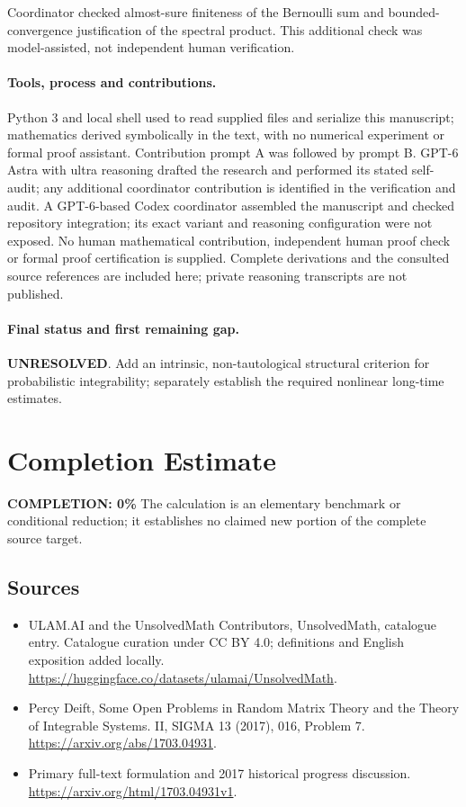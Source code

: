 \documentclass[11pt]{article}
\begin{document}
Coordinator checked almost-sure finiteness of the Bernoulli sum and bounded-convergence justification of the spectral product. This additional check was model-assisted, not independent human verification.

\paragraph{Tools, process and contributions.}
Python 3 and local shell used to read supplied files and serialize this manuscript; mathematics derived symbolically in the text, with no numerical experiment or formal proof assistant. Contribution prompt A was followed by prompt B. GPT-6 Astra with ultra reasoning drafted the research and performed its stated self-audit; any additional coordinator contribution is identified in the verification and audit. A GPT-6-based Codex coordinator assembled the manuscript and checked repository integration; its exact variant and reasoning configuration were not exposed. No human mathematical contribution, independent human proof check or formal proof certification is supplied. Complete derivations and the consulted source references are included here; private reasoning transcripts are not published.

\paragraph{Final status and first remaining gap.}
\textbf{UNRESOLVED}. Add an intrinsic, non-tautological structural criterion for probabilistic integrability; separately establish the required nonlinear long-time estimates.

\section{Completion Estimate}
\noindent\textbf{COMPLETION: 0\%}
The calculation is an elementary benchmark or conditional reduction; it establishes no claimed new portion of the complete source target.

\subsection{Sources}
\begin{itemize}
\item[\hypertarget{source:statement:1}{S1}] ULAM.AI and the UnsolvedMath Contributors, UnsolvedMath, catalogue entry. Catalogue curation under CC BY 4.0; definitions and English exposition added locally.
\url{https://huggingface.co/datasets/ulamai/UnsolvedMath}.
\item[\hypertarget{source:statement:2}{S2}] Percy Deift, Some Open Problems in Random Matrix Theory and the Theory of Integrable Systems. II, SIGMA 13 (2017), 016, Problem 7.
\url{https://arxiv.org/abs/1703.04931}.
\item[\hypertarget{source:statement:3}{S3}] Primary full-text formulation and 2017 historical progress discussion.
\url{https://arxiv.org/html/1703.04931v1}.
\end{itemize}
\label{end:statement}
\end{document}
